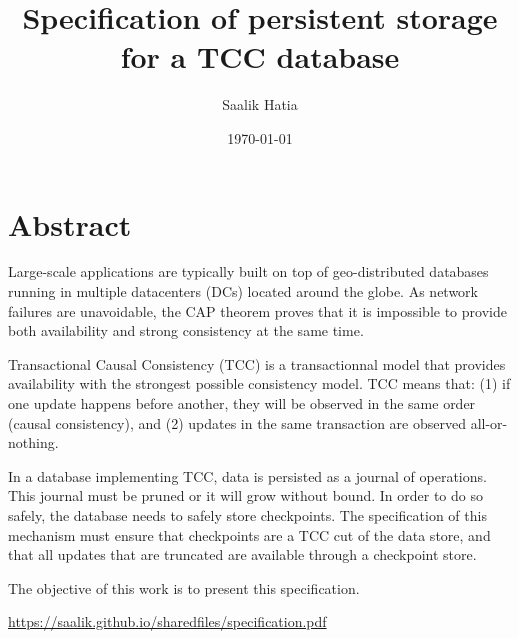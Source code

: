 \documentclass[11pt]{article}
\begin{document}
\author{Saalik Hatia}
\title{Specification of persistent storage for a TCC database}
\date\today
\maketitle

\section{Abstract}

Large-scale applications are typically built on top of geo-distributed
databases running in multiple datacenters (DCs) located around the
globe. As network failures are unavoidable, the CAP theorem proves
that it is impossible to provide both availability and strong
consistency at the same time.

Transactional Causal Consistency (TCC) is a transactionnal model that provides 
availability with the strongest possible consistency model. 
TCC means that: 
(1) if one update happens before another, they will be
observed in the same order (causal consistency), and (2) updates in the
same transaction are observed all-or-nothing.

In a database implementing TCC, data is persisted as a journal of operations.
This journal must be pruned or it will grow without bound.
In order to do so safely, the database needs to safely store 
checkpoints.
The specification of this mechanism must ensure that checkpoints are a TCC
cut of the data store, and that all updates that are truncated are available
through a checkpoint store.

The objective of this work is to present this specification.

\url{https://saalik.github.io/sharedfiles/specification.pdf}
\end{document}
